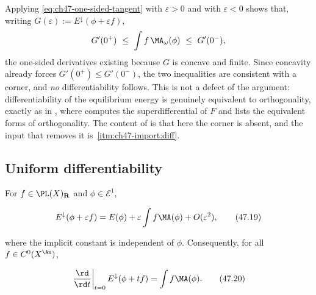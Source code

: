 \begin{remark}
\label{rem:ch47-one-sided-scope}
Applying \eqref{eq:ch47-one-sided-tangent} with $\varepsilon>0$ and with
$\varepsilon<0$ shows that, writing
$G(\varepsilon):=E^\downarrow(\phi+\varepsilon f)$,
\[
 G'(0^+)\ \le\ \int f\,\MA_\omega(\phi)\ \le\ G'(0^-),
\]
the one-sided derivatives existing because $G$ is concave and finite.
Since concavity already forces $G'(0^+)\le G'(0^-)$, the two inequalities
are consistent with a corner, and \emph{no} differentiability follows.
This is not a defect of the argument: differentiability of the equilibrium
energy is genuinely equivalent to orthogonality, exactly as in
, where  computes the
superdifferential of $F$ and
 lists the equivalent forms of
orthogonality.  The content of
 is that here the corner is absent,
and the input that removes it is
\,\cref{itm:ch47-import:diff}.
\end{remark}

\subsection{Uniform differentiability}
\label{sec:ch47-uniform-diff}

\begin{theorem}\label{thm:bj-energy-differentiability}
For $f\in\PL(X)_{\mathbf R}$ and $\phi\in\mathcal E^1$,

\[
 E^\downarrow(\phi+\varepsilon f)
 =E(\phi)+\varepsilon\int f\MA(\phi)+O(\varepsilon^2),
\tag{47.19}\label{eq:bj-uniform-differentiability}
\]

where the implicit constant is independent of $\phi$.  Consequently, for
all $f\in C^0(X^{\An})$,

\[
 \left.\frac{\rd}{\rd t}\right|_{t=0}E^\downarrow(\phi+tf)
                =\int f\MA(\phi).
\tag{47.20}\label{eq:bj-first-variation}
\]
\end{theorem}

